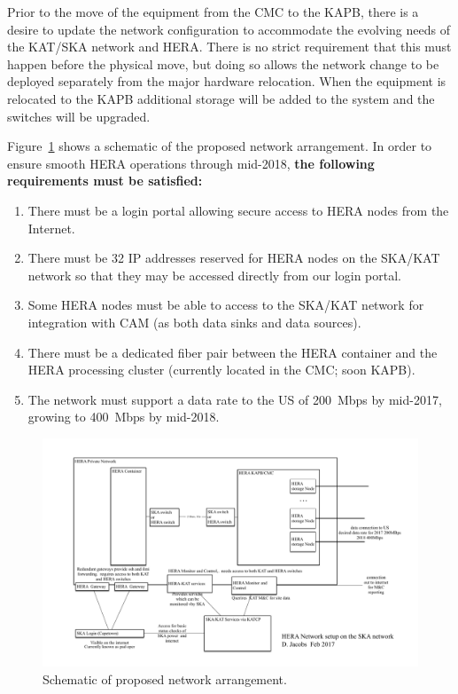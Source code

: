 \documentclass{article}
\begin{document}
Prior to the move of the equipment from the CMC to the KAPB, there is a desire
to update the network configuration to accommodate the evolving needs of the
KAT/SKA network and HERA.  There is no strict requirement that this must
happen before the physical move, but doing so allows the network change to be
deployed separately from the major hardware relocation.  When the equipment is relocated to the KAPB additional storage will be added to the system and the switches will be upgraded.

Figure~\ref{fig:net_org} shows a schematic of the proposed network arrangement. In order to ensure smooth HERA operations through mid-2018, \textbf{the following requirements must be satisfied:}
\begin{enumerate}
\item There must be a login portal allowing secure access to HERA nodes from the Internet.
\item There must be 32 IP addresses reserved for HERA nodes on the SKA/KAT network so that they may be accessed directly from our login portal.
\item Some HERA nodes must be able to access to the SKA/KAT network for integration with CAM (as both data sinks and data sources).
\item There must be a dedicated fiber pair between the HERA container and the HERA processing cluster (currently located in the CMC; soon KAPB).
\item The network must support a data rate to the US of 200~Mbps by mid-2017, growing to 400~Mbps by mid-2018.
\end{enumerate}

\begin{figure}[H]
\includegraphics[width=\textwidth]{HERA_2017_network_organization.pdf}
\centering
\caption{Schematic of proposed network arrangement.}
\label{fig:net_org}
\end{figure}
\end{document}
